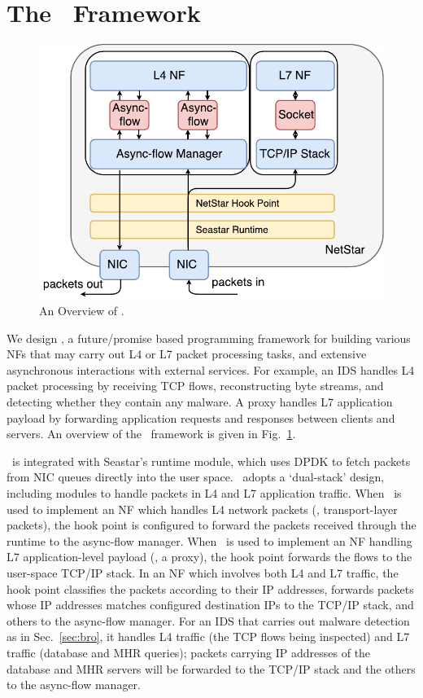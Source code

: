 \section{The \netstar~Framework}
\label{framework}

\begin{figure}[!h]
  \centering
  \includegraphics[width=0.6\columnwidth]{chap-netstar/figure/netstar-overvew.pdf}
  \caption{An Overview of \netstar.}
  \label{fig:overview}
\end{figure}

We design \netstar, a future/promise based programming framework for building various NFs that may carry out L4 or L7 packet processing tasks, and extensive asynchronous interactions with external services. For example, an IDS handles L4 packet processing by receiving TCP flows, reconstructing byte streams, and detecting whether they contain any malware. A proxy handles L7 application payload by forwarding application requests and responses between clients and servers. An overview of the \netstar~framework is given in Fig.~\ref{fig:overview}.


\netstar~is integrated with Seastar's runtime module, which uses DPDK to fetch packets from NIC queues directly into the user space.
\netstar~adopts a `dual-stack' design, including modules to handle packets in L4 and L7 application traffic. When \netstar~is used to implement an NF which handles L4 network packets (\ie, transport-layer packets), the hook point is configured to forward the packets received through the runtime to the async-flow manager. When \netstar~is used to implement an NF handling L7 application-level payload (\eg, a proxy), the hook point forwards the flows to the user-space TCP/IP stack. In an NF which involves both L4 and L7 traffic, the hook point classifies the packets according to their IP addresses, forwards packets whose IP addresses matches configured destination IPs to the TCP/IP stack, and others to the async-flow manager. For an IDS that carries out malware detection as in Sec.~\ref{sec:bro}, it handles L4 traffic (the TCP flows being inspected) and L7 traffic (database and MHR queries); packets carrying IP addresses of the database and MHR servers will be forwarded to the TCP/IP stack and the others to the async-flow manager.


